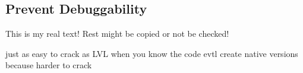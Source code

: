 \subsection{Prevent Debuggability} \label{subsection:subsection:evaluation-tampering-debuggable}
This is my real text! Rest might be copied or not be checked!

just as easy to crack as LVL when you know the code\newline
evtl create native versions because harder to crack\newline
